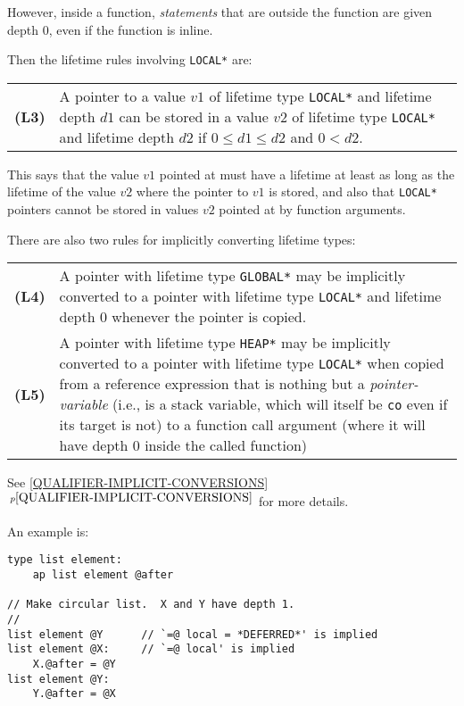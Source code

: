 \documentclass[12pt]{article}
\newcommand{\key}[1]{{\rm \bfseries #1}}
\newcommand{\itemref}[1]{\ref{#1}$\,^{p\pageref{#1}}$}
\newenvironment{indpar}[1][0.3in]%
	{\begin{list}{}%
		     {\setlength{\itemsep}{0in}%
		      \setlength{\topsep}{0in}%
		      \setlength{\parsep}{1ex}%
		      \setlength{\labelwidth}{#1}%
		      \setlength{\leftmargin}{#1}%
		      \addtolength{\leftmargin}{\labelsep}}%
	 \item}%
	{\end{list}}
\begin{document}
However, inside a function,
{\em statements} that are outside the function are given
depth 0, even if the function is inline.

Then the lifetime rules involving {\tt *LOCAL*} are:
\begin{indpar}[0.2in]
\begin{tabular}{lp{5.0in}}
\key{(L3)}	& A pointer to a value $v1$ of lifetime type {\tt *LOCAL*}
                  and lifetime depth $d1$
                  can be stored in a value $v2$ of lifetime type {\tt *LOCAL*}
		  and lifetime depth $d2$
		  if $0\leq d1\leq d2$ and $0<d2$.
\end{tabular}
\end{indpar}

This says that the value $v1$ pointed at must have a lifetime at least
as long as the lifetime of the value $v2$ where the pointer to $v1$
is stored, and also that {\tt *LOCAL*} pointers cannot be stored in
values $v2$ pointed at by function arguments.

There are also two rules for implicitly converting lifetime types:
\begin{indpar}[0.2in]
\begin{tabular}{lp{5.0in}}
\key{(L4)}	& A pointer with lifetime type {\tt *GLOBAL*} may be
                  implicitly converted to a pointer with lifetime type
		  {\tt *LOCAL*} and lifetime depth 0 whenever the pointer
		  is copied.
\\[1ex]
\key{(L5)}	& A pointer with lifetime type {\tt *HEAP*} may be
                  implicitly converted to a pointer with lifetime type
		  {\tt *LOCAL*} when copied from a reference expression 
		  that is nothing but a {\em pointer-variable}
		  (i.e., is a stack variable, which will itself be
		  {\tt co} even if its target is not) to a function call
		  argument (where it will have depth 0 inside the called
		  function)
\end{tabular}
\end{indpar}

See \itemref{QUALIFIER-IMPLICIT-CONVERSIONS} for more details.

An example is:
\begin{indpar}\begin{verbatim}
type list element:
    ap list element @after

// Make circular list.  X and Y have depth 1.
//
list element @Y      // `=@ local = *DEFERRED*' is implied
list element @X:     // `=@ local' is implied
    X.@after = @Y
list element @Y:
    Y.@after = @X
\end{verbatim}\end{indpar}
\end{document}
